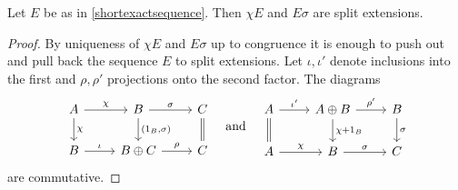 \begin{lemma}
Let $E$ be as in \eqref{shortexactsequence}.
Then $\chi E$ and $E \sigma$ are split extensions.
\end{lemma}
\begin{proof}
By uniqueness of $\chi E$ and $E\sigma$ up to congruence it is enough to push out and pull back the sequence $E$ to split extensions.
Let $\iota, \iota'$ denote inclusions into the first and $\rho, \rho'$ projections onto the second factor.
The diagrams
\begin{equation*}
\begin{tikzcd}
A \arrow{r}{\chi} \arrow{d}{\chi}&
B \arrow{r}{\sigma} \arrow{d}{(1_B,\sigma)}&
C \arrow[d,equal]
\\
B \arrow{r}{\iota} &
B \oplus C \arrow{r}{\rho} &
C
\end{tikzcd}
\quad \text{and} \quad
\begin{tikzcd}
A \arrow{r}{\iota'} \arrow[d,equal]&
A\oplus B \arrow{r}{\rho'} \arrow{d}{\chi + 1_B}&
B \arrow{d}{\sigma}
\\
A \arrow{r}{\chi} &
B \arrow{r}{\sigma} &
C 
\end{tikzcd}
\end{equation*}
are commutative.
\end{proof}
